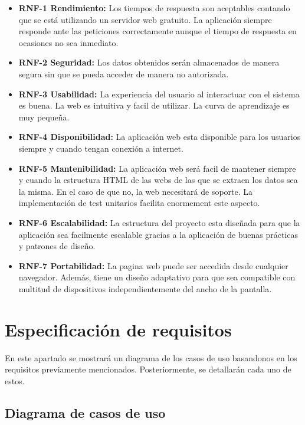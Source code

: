 \begin{itemize}
\item\textbf{RNF-1 Rendimiento:} Los tiempos de respuesta son aceptables contando que se está utilizando un servidor web gratuito. La aplicación siempre responde ante las peticiones correctamente aunque el tiempo de respuesta en ocasiones no sea inmediato.
\item\textbf{RNF-2 Seguridad:} Los
datos obtenidos serán almacenados de manera segura sin que se pueda acceder de manera no autorizada. 
\item\textbf{RNF-3 Usabilidad:} La experiencia del usuario al interactuar con el sistema es buena. La web es intuitiva y facil de utilizar. La curva de aprendizaje es muy pequeña. 
\item\textbf{RNF-4 Disponibilidad:} La aplicación web esta disponible para los usuarios siempre y cuando tengan conexión a internet.
\item\textbf{RNF-5 Mantenibilidad:} La aplicación web será facil de mantener siempre y cuando la estructura HTML de las webs de las que se extraen los datos sea la misma. En el caso de que no, la web necesitará de soporte. La implementación de test unitarios facilita enormement este aspecto.
\item\textbf{RNF-6 Escalabilidad:} La estructura del proyecto esta diseñada para que la aplicación sea facilmente escalable gracias a la aplicación de buenas prácticas y patrones de diseño.
\item\textbf{RNF-7 Portabilidad:} La pagina web puede ser accedida desde cualquier navegador. Además, tiene un diseño adaptativo para que sea compatible con multitud de dispositivos independientemente del ancho de la pantalla.

\end{itemize}





\section{Especificación de requisitos}
En este apartado se mostrará un diagrama de los casos de uso basandonos en los requisitos previamente mencionados. Posteriormente, se detallarán cada uno de estos.

\newpage
\begin{landscape}
\subsection{Diagrama de casos de uso}\label{diagrama-de-casos-de-uso}
\vspace{1cm}
\end{landscape}
\newpage

